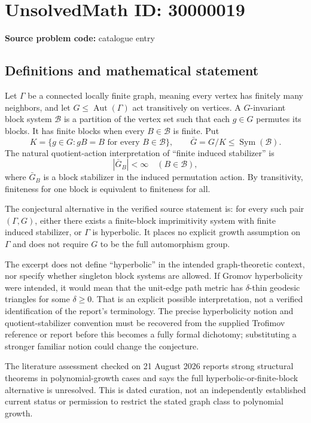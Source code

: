 \documentclass[11pt]{article}
\begin{document}
\section*{UnsolvedMath ID: 30000019}
\textbf{Source problem code:} catalogue entry
\subsection{Definitions and mathematical statement}
Let $\Gamma$ be a connected locally finite graph, meaning every vertex has finitely many neighbors, and let $G\le\operatorname{Aut}(\Gamma)$ act transitively on vertices. A $G$-invariant block system $\mathcal B$ is a partition of the vertex set such that each $g\in G$ permutes its blocks. It has finite blocks when every $B\in\mathcal B$ is finite. Put
\[
 K=\{g\in G:gB=B\text{ for every }B\in\mathcal B\},\qquad
 \bar G=G/K\le\operatorname{Sym}(\mathcal B).
\]
The natural quotient-action interpretation of ``finite induced stabilizer'' is
\[
 |\bar G_B|<\infty\quad(B\in\mathcal B),
\]
where $\bar G_B$ is a block stabilizer in the induced permutation action. By transitivity, finiteness for one block is equivalent to finiteness for all.

The conjectural alternative in the verified source statement is: for every such pair $(\Gamma,G)$, either there exists a finite-block imprimitivity system with finite induced stabilizer, or $\Gamma$ is hyperbolic. It places no explicit growth assumption on $\Gamma$ and does not require $G$ to be the full automorphism group.

The excerpt does not define ``hyperbolic'' in the intended graph-theoretic context, nor specify whether singleton block systems are allowed. If Gromov hyperbolicity were intended, it would mean that the unit-edge path metric has $\delta$-thin geodesic triangles for some $\delta\ge0$. That is an explicit possible interpretation, not a verified identification of the report's terminology. The precise hyperbolicity notion and quotient-stabilizer convention must be recovered from the supplied Trofimov reference or report before this becomes a fully formal dichotomy; substituting a stronger familiar notion could change the conjecture.

The literature assessment checked on 21 August 2026 reports strong structural theorems in polynomial-growth cases and says the full hyperbolic-or-finite-block alternative is unresolved. This is dated curation, not an independently established current status or permission to restrict the stated graph class to polynomial growth.
\end{document}
